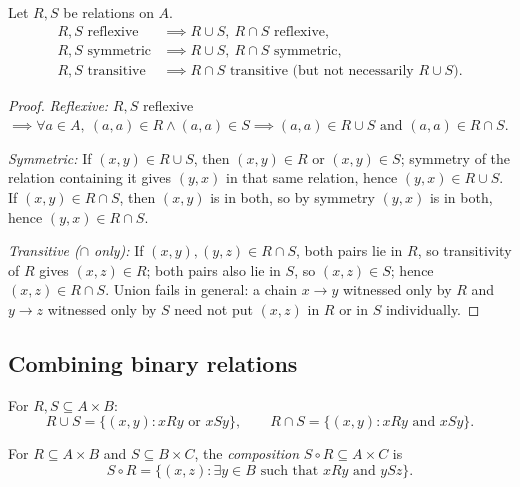 \documentclass[11pt]{article}
\begin{document}
\begin{theorem}
Let $R,S$ be relations on $A$.
\begin{align*}
R,S \text{ reflexive} &\implies R\cup S,\ R\cap S \text{ reflexive}, \\
R,S \text{ symmetric} &\implies R\cup S,\ R\cap S \text{ symmetric}, \\
R,S \text{ transitive} &\implies R\cap S \text{ transitive (but not necessarily } R\cup S\text{)}.
\end{align*}
\end{theorem}
\begin{proof}
\emph{Reflexive:} $R,S$ reflexive $\implies \forall a\in A,\ (a,a)\in R \wedge (a,a)\in S \implies (a,a) \in R\cup S \text{ and } (a,a)\in R\cap S$.

\emph{Symmetric:} If $(x,y) \in R\cup S$, then $(x,y)\in R$ or $(x,y)\in S$; symmetry of the relation containing it gives $(y,x)$ in that same relation, hence $(y,x)\in R\cup S$. If $(x,y)\in R\cap S$, then $(x,y)$ is in both, so by symmetry $(y,x)$ is in both, hence $(y,x)\in R\cap S$.

\emph{Transitive ($\cap$ only):} If $(x,y),(y,z) \in R\cap S$, both pairs lie in $R$, so transitivity of $R$ gives $(x,z)\in R$; both pairs also lie in $S$, so $(x,z)\in S$; hence $(x,z)\in R\cap S$. Union fails in general: a chain $x\to y$ witnessed only by $R$ and $y\to z$ witnessed only by $S$ need not put $(x,z)$ in $R$ or in $S$ individually.
\end{proof}

\subsection{Combining binary relations}
\label{sec:2-15}

\begin{definition}
For $R,S \subseteq A \times B$:
\[
R \cup S = \{(x,y) : xRy \text{ or } xSy\}, \qquad
R \cap S = \{(x,y) : xRy \text{ and } xSy\}.
\]
\end{definition}

\begin{definition}
For $R \subseteq A \times B$ and $S \subseteq B \times C$, the \emph{composition} $S \circ R \subseteq A \times C$ is
\[
S \circ R = \{(x,z) : \exists y \in B \text{ such that } xRy \text{ and } ySz\}.
\]
\end{definition}
\end{document}
